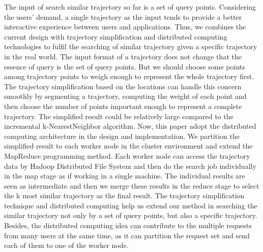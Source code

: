 \begin{bigabstract}
The input of search similar trajectory so far is a set of query points. Considering the users' demand, a single trajectory as the input tends to provide a better interactive experience between users and applications. Thus, we combines the current design with trajectory simplification and distributed computing technologies to fulfil the searching of similar trajectory given a specific trajectory in the real world. The input format of a trajectory does not change that the essence of query is the set of query points. But we should choose some points among trajectory points to weigh enough to represent the whole trajectory first. The trajectory simplification based on the locations can handle this concern smoothly by segmenting a trajectory, computing the weight of each point and then choose the number of points important enough to represent a complete trajectory. The simplified result could be relatively large compared to the incremental k-NearestNeighbor algorithm. Now, this paper adopt the distributed computing architecture in the design and implementation. We partition the simplified result to each worker node in the cluster environment and extend the MapReduce programming method. Each worker node can access the trajectory data by Hadoop Distributed File System and then do the search job individually in the map stage as if working in a single machine. The individual results are seen as intermediate and then we merge these results in the reduce stage to select the k most similar trajectory as the final result. The trajectory simplification technique and distributed computing help us extend our method in searching the similar trajectory not only by a set of query points, but also a specific trajectory. Besides, the distributed computing idea can contribute to the multiple requests from many users at the same time, as it can partition the request set and send each of them to one of the worker node.

\end{bigabstract}